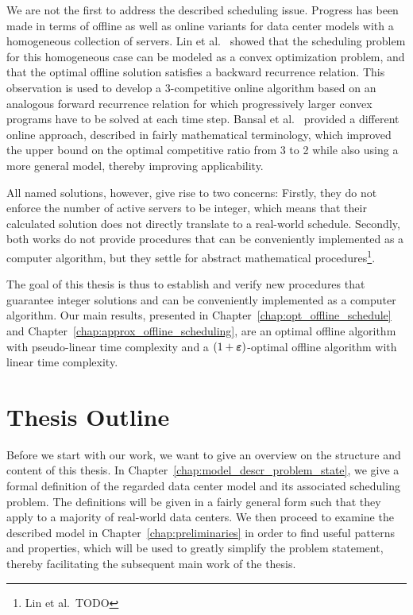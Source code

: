 We are not the first to address the described scheduling issue. Progress has been made in terms of offline as well as online variants for data center models with a homogeneous collection of servers. Lin et al.~\parencite{dyn-right-sizing} showed that the scheduling problem for this homogeneous case can be modeled as a convex optimization problem, and that the optimal offline solution satisfies a backward recurrence relation. This observation is used to develop a 3-competitive online algorithm based on an analogous forward recurrence relation for which progressively larger convex programs have to be solved at each time step. Bansal et al.~\parencite{bansal-soco} provided a different online approach, described in fairly mathematical terminology, which improved the upper bound on the optimal competitive ratio from 3 to 2 while also using a more general model, thereby improving applicability. 

All named solutions, however, give rise to two concerns: Firstly, they do not enforce the number of active servers to be integer, which means that their calculated solution does not directly translate to a real-world schedule. Secondly, both works do not provide procedures that can be conveniently implemented as a computer algorithm, but they settle for abstract mathematical procedures\footnote{Lin et al.\ TODO}.

The goal of this thesis is thus to establish and verify new procedures that guarantee integer solutions and can be conveniently implemented as a computer algorithm. Our main results, presented in Chapter~\ref{chap:opt_offline_schedule} and Chapter~\ref{chap:approx_offline_scheduling}, are an optimal offline algorithm with pseudo-linear time complexity and a $(1+\boldsymbol\varepsilon)$-optimal offline algorithm with linear time complexity.

\section{Thesis Outline}
Before we start with our work, we want to give an overview on the structure and content of this thesis. In Chapter~\ref{chap:model_descr_problem_state}, we give a formal definition of the regarded data center model and its associated scheduling problem. The definitions will be given in a fairly general form such that they apply to a majority of real-world data centers. We then proceed to examine the described model in Chapter~\ref{chap:preliminaries} in order to find useful patterns and properties, which will be used to greatly simplify the problem statement, thereby facilitating the subsequent main work of the thesis.

